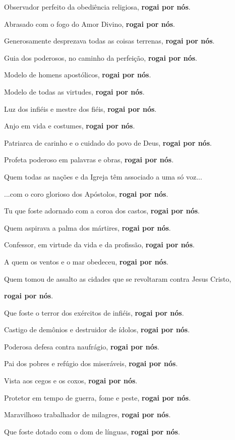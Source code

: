 \documentclass[11pt]{article}
\begin{document}
\begin{justify}
Observador perfeito da obediência religiosa, \textbf{rogai por nós}.

Abrasado com o fogo do Amor Divino, \textbf{rogai por nós}.

Generosamente desprezava todas as coisas terrenas, \textbf{rogai por nós}.

Guia dos poderosos, no caminho da perfeição, \textbf{rogai por nós}.

Modelo de homens apostólicos, \textbf{rogai por nós}.

Modelo de todas as virtudes, \textbf{rogai por nós}.

Luz dos infiéis e mestre dos fiéis, \textbf{rogai por nós}.

Anjo em vida e costumes, \textbf{rogai por nós}.

Patriarca de carinho e o cuidado do povo de Deus, \textbf{rogai por nós}.

Profeta poderoso em palavras e obras, \textbf{rogai por nós}.

Quem todas as nações e da Igreja têm associado a uma só voz...

...com o coro glorioso dos Apóstolos, \textbf{rogai por nós}.

Tu que foste adornado com a coroa dos castos, \textbf{rogai por nós}.

Quem aspirava a palma dos mártires, \textbf{rogai por nós}.

Confessor, em virtude da vida e da profissão, \textbf{rogai por nós}.

A quem os ventos e o mar obedeceu, \textbf{rogai por nós}.

Quem tomou de assalto as cidades que se revoltaram contra Jesus Cristo,

\textbf{rogai por nós}.

Que foste o terror dos exércitos de infiéis, \textbf{rogai por nós}.

Castigo de demônios e destruidor de ídolos, \textbf{rogai por nós}.

Poderosa defesa contra naufrágio, \textbf{rogai por nós}.

Pai dos pobres e refúgio dos miseráveis, \textbf{rogai por nós}.

Vista aos cegos e os coxos, \textbf{rogai por nós}.

Protetor em tempo de guerra, fome e peste, \textbf{rogai por nós}.

Maravilhoso trabalhador de milagres, \textbf{rogai por nós}.

Que foste dotado com o dom de línguas, \textbf{rogai por nós}.


\end{justify}
\end{document}
